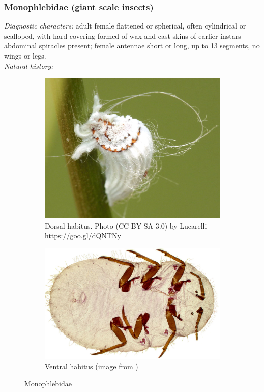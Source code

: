 \documentclass[letterpaper, 11pt]{article}
\begin{document}
\subsubsection{Monophlebidae (giant scale insects)}
\noindent{}\textit{Diagnostic characters:} adult female flattened or spherical, often cylindrical or scalloped, with hard covering formed of wax and cast skins of earlier instars abdominal spiracles present; female antennae short or long, up to 13 segments, no wings or legs.\\

\noindent{}\textit{Natural history:} \\

\begin{figure}[ht!]
 \centering
 \begin{subfigure}[ht!]{0.42\textwidth}
  \includegraphics[width=\textwidth]{MonophlebidDorsalHabitus}
  \caption{Dorsal habitus. Photo (CC BY-SA 3.0) by Lucarelli \url{https://goo.gl/dQNTNy}}
  \label{fig:monophlebid1}
 \end{subfigure}
 \qquad
 \begin{subfigure}[ht!]{0.45\textwidth}
  \includegraphics[width=\textwidth]{MonophlebidHabitus}
  \caption{Ventral habitus (image from \cite{ScaleNet})}
  \label{fig:monophlebid2}
 \end{subfigure}
 \caption{Monophlebidae}\label{fig:monophlebids}
\end{figure}
\end{document}
